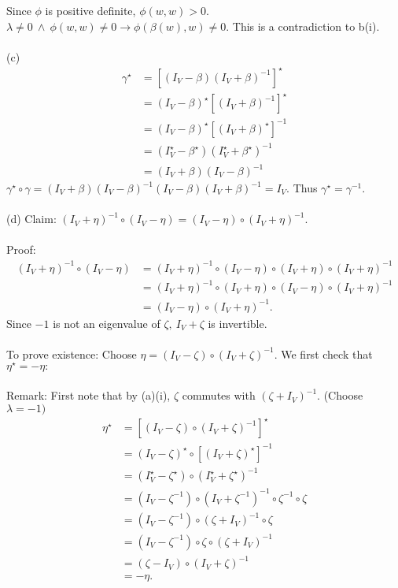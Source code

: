 \documentclass{article}
\begin{document}
Since $\phi$ is positive definite, $\phi(w,w) > 0.$ $\lambda \neq 0 \ \land \ \phi(w,w)\neq 0\to \phi(\beta(w),w)\neq 0$. This is a contradiction to b(i).\\\\
(c)\begin{align*}
\gamma^\star &= [(I_V-\beta)(I_V+\beta)^{-1}]^\star\\
&= (I_V-\beta)^\star[(I_V+\beta)^{-1}]^\star\\
&= (I_V-\beta)^\star[(I_V+\beta)^{\star}]^{-1}\\
&= (I_V^\star-\beta^\star)(I_V^\star+\beta^\star)^{-1}\\
& = (I_V + \beta)(I_V - \beta)^{-1}
\end{align*}
$\gamma^\star\circ\gamma = (I_V + \beta)(I_V-\beta)^{-1}(I_V-\beta)(I_V+\beta)^{-1} = I_V.$ Thus $\gamma^\star = \gamma^{-1}.$\\\\
(d) Claim: $(I_V+\eta)^{-1}\circ(I_V-\eta) = (I_V-\eta)\circ(I_V+\eta)^{-1}.$\\\\
Proof:\begin{align*}
    (I_V+\eta)^{-1}\circ(I_V-\eta) &= (I_V+\eta)^{-1}\circ(I_V-\eta)\circ(I_V+\eta)\circ(I_V+\eta)^{-1}\\
&= (I_V + \eta)^{-1}\circ(I_V+\eta)\circ(I_V - \eta)\circ(I_V + \eta)^{-1}\\
&= (I_V-\eta)\circ(I_V+\eta)^{-1}.
\end{align*}
Since $-1$ is not an eigenvalue of $\zeta,\ I_V+\zeta$ is invertible.
\\\\
To prove existence: Choose $\eta = (I_V-\zeta)\circ(I_V+\zeta)^{-1}$. We first check that $\eta^{\star} = -\eta:$\\\\
Remark: First note that by (a)(i), $\zeta$ commutes with $(\zeta + I_V)^{-1}.$ (Choose $\lambda = -1)
$
\begin{align*}
    \eta^\star &= [(I_V-\zeta)\circ(I_V + \zeta)^{-1}]^\star\\
    &= (I_V - \zeta)^\star\circ[(I_V + \zeta)^\star]^{-1} \\
    &= (I_V^\star - \zeta^\star)\circ(I_V^\star + \zeta^\star)^{-1}\\
    &= (I_V - \zeta^{-1})\circ(I_V + \zeta^{-1})^{-1}\circ\zeta^{-1}\circ\zeta\\
    &= (I_V-\zeta^{-1})\circ(\zeta+I_V)^{-1}\circ\zeta\\
    &= (I_V - \zeta^{-1})\circ\zeta\circ(\zeta+I_V)^{-1}\\
    &= (\zeta - I_V)\circ(I_V + \zeta)^{-1}\\
    &= -\eta.
\end{align*}
\end{document}
